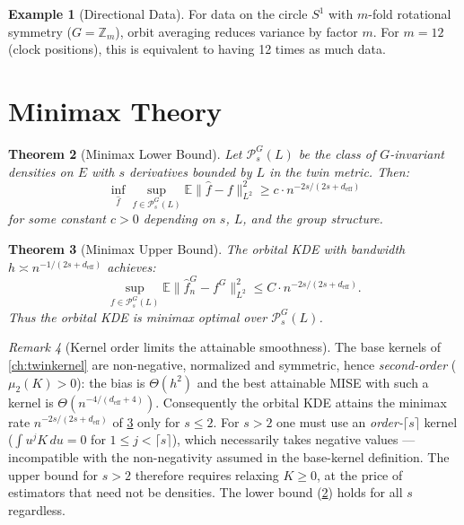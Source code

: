\documentclass[11pt,twoside,openright]{book}
\theoremstyle{plain}
\newtheorem{theorem}{Theorem}[chapter]
\theoremstyle{definition}
\newtheorem{example}[theorem]{Example}
\theoremstyle{remark}
\newtheorem{remark}[theorem]{Remark}
\newcommand{\calP}{\mathcal{P}}
\newcommand{\Zd}{\mathbb{Z}}
\newcommand{\norm}[1]{\|#1\|}
\newcommand{\E}{\mathbb{E}}
\newcommand{\deff}{d_{\mathrm{eff}}}
\begin{document}
\begin{example}[Directional Data]
For data on the circle $S^1$ with $m$-fold rotational symmetry ($G = \Zd_m$), orbit averaging reduces variance by factor $m$. For $m = 12$ (clock positions), this is equivalent to having 12 times as much data.
\end{example}

\section{Minimax Theory}

\begin{theorem}[Minimax Lower Bound]
\label{thm:kde-minimax-lower}
Let $\calP^G_s(L)$ be the class of $G$-invariant densities on $E$ with $s$ derivatives bounded by $L$ in the twin metric. Then:
\begin{equation}
\inf_{\hat{f}} \sup_{f \in \calP^G_s(L)} \E\norm{\hat{f} - f}_{L^2}^2 \geq c \cdot n^{-2s/(2s + \deff)}
\label{eq:kde-minimax-lower}
\end{equation}
for some constant $c > 0$ depending on $s$, $L$, and the group structure.
\end{theorem}

\begin{theorem}[Minimax Upper Bound]
\label{thm:kde-minimax-upper}
The orbital KDE with bandwidth $h \asymp n^{-1/(2s + \deff)}$ achieves:
\begin{equation}
\sup_{f \in \calP^G_s(L)} \E\norm{\hat{f}_n^G - f^G}_{L^2}^2 \leq C \cdot n^{-2s/(2s + \deff)}.
\label{eq:kde-minimax-upper}
\end{equation}
Thus the orbital KDE is minimax optimal over $\calP^G_s(L)$.
\end{theorem}

\begin{remark}[Kernel order limits the attainable smoothness]
\label{rem:kernel-order}
The base kernels of \cref{ch:twinkernel} are non-negative, normalized and symmetric, hence \emph{second-order} ($\mu_2(K)>0$): the bias is $\Theta(h^2)$ and the best attainable MISE with such a kernel is $\Theta(n^{-4/(\deff+4)})$. Consequently the orbital KDE attains the minimax rate $n^{-2s/(2s+\deff)}$ of \cref{thm:kde-minimax-upper} only for $s\le 2$. For $s>2$ one must use an \emph{order-$\lceil s\rceil$} kernel ($\int u^j K\,du=0$ for $1\le j<\lceil s\rceil$), which necessarily takes negative values --- incompatible with the non-negativity assumed in the base-kernel definition. The upper bound for $s>2$ therefore requires relaxing $K\ge0$, at the price of estimators that need not be densities. The lower bound (\cref{thm:kde-minimax-lower}) holds for all $s$ regardless.
\end{remark}
\end{document}
